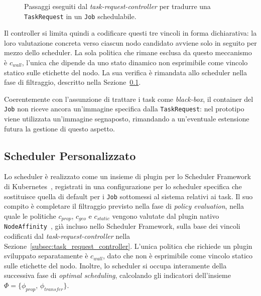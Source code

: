\begin{figure}[htb]
    \caption{Passaggi eseguiti dal \emph{task-request-controller} per tradurre una \texttt{TaskRequest} in un \texttt{Job} schedulabile.}
    \label{fig:controller_dettaglio}
\end{figure}

Il controller si limita quindi a codificare questi tre vincoli in forma dichiarativa: la loro valutazione concreta verso ciascun nodo candidato avviene solo in seguito per mezzo dello scheduler. La sola politica che rimane esclusa da questo meccanismo è $c_{wall}$, l'unica che dipende da uno stato dinamico non esprimibile come vincolo statico sulle etichette del nodo. La sua verifica è rimandata allo scheduler nella fase di filtraggio, descritto nella Sezione~\ref{subsec:scheduler}.

Coerentemente con l'assunzione di trattare i task come \emph{black-box}, il container del \texttt{Job} non riceve ancora un'immagine specifica dalla \texttt{TaskRequest}: nel prototipo viene utilizzata un'immagine segnaposto, rimandando a un'eventuale estensione futura la gestione di questo aspetto.


\subsection{Scheduler Personalizzato}
\label{subsec:scheduler}

Lo scheduler è realizzato come un insieme di plugin per lo Scheduler Framework di Kubernetes~\cite{k8s-scheduler-framework, k8s-scheduler}, registrati in una configurazione per lo scheduler specifica che sostituisce quella di default per i \texttt{Job} sottomessi al sistema relativi ai task. Il suo compito è completare il filtraggio previsto nella fase di \emph{policy evaluation}, nella quale le politiche $c_{prop}$, $c_{geo}$ e $c_{static}$ vengono valutate dal plugin nativo \texttt{NodeAffinity}~\cite{k8s-scheduler-config}, già incluso nello Scheduler Framework, sulla base dei vincoli codificati dal \emph{task-request-controller} nella Sezione~\ref{subsec:task_request_controller}. L'unica politica che richiede un plugin sviluppato separatamente è $c_{wall}$, dato che non è esprimibile come vincolo statico sulle etichette del nodo. Inoltre, lo scheduler si occupa interamente della successiva fase di \emph{optimal scheduling}, calcolando gli indicatori dell'insieme $\Phi = \{\phi_{prop},\, \phi_{transfer}\}$. 


